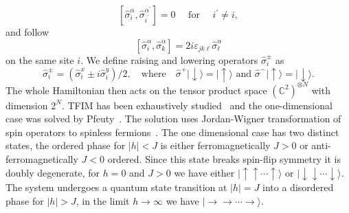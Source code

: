 \begin{equation}
	\left[\hat{\sigma}_{i}^{\alpha}, \hat{\sigma}_{i^{\prime}}^{\alpha^{\prime}}\right]=0 \quad \text { for } \quad i^{\prime} \neq i, 
\end{equation}
and follow 
\begin{equation}
	\left[\hat \sigma^\alpha_{i}, \hat \sigma^\alpha_{k}\right]=2 i \varepsilon_{j k \ell} \hat \sigma^\alpha_{\ell}
\end{equation}
on the same site $i$. We define raising and lowering operators $\hat{\sigma}_{i}^{\pm}$ as
\begin{equation}
\hat{\sigma}_{i}^{\pm} = \left(\hat{\sigma}_{i}^{x} \pm i \hat{\sigma}_{i}^{y}\right) / 2, \quad \text{where} \quad \hat{\sigma}^{+}|\downarrow\rangle=|\uparrow\rangle \text { and } \hat{\sigma}^{-}|\uparrow\rangle=|\downarrow\rangle.
\end{equation}
The whole Hamiltonian then acts on the tensor product space $\left(\mathbb{C}^{2}\right)^{\otimes N}$ with dimension $2^N$. TFIM has been exhaustively studied~\cite{stinchcombe1973isingI, stinchcombe1973isingII} and the one-dimensional case was solved by Pfeuty~\cite{pfeuty1970one}. The solution uses Jordan-Wigner transformation of spin operators to spinless fermions~\cite{lieb1961two, niemeijer1967some}. The one dimensional case has two distinct states, the ordered phase for $|h| < J$ is either ferromagnetically $J > 0$ or anti-ferromagnetically $J < 0$ ordered. Since this state breaks spin-flip symmetry it is doubly degenerate, for $h=0$ and $J>0$ we have either $|\uparrow \uparrow \cdots \uparrow \rangle$ or $|\downarrow \downarrow \cdots \downarrow \rangle$. The system undergoes a quantum state transition at $|h| = J$ into a disordered phase for $|h| > J$, in the limit $h \rightarrow \infty$ we have $|\rightarrow \rightarrow \cdots \rightarrow \rangle$. 


